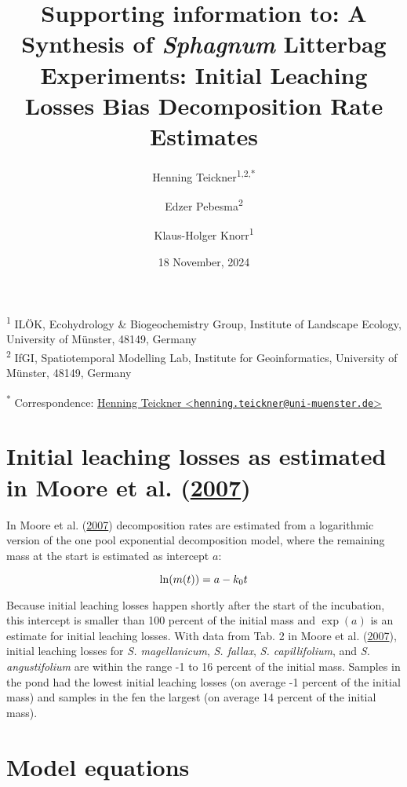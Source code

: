 \documentclass[
  12pt,
]{article}
\title{Supporting information to: A Synthesis of \emph{Sphagnum} Litterbag Experiments: Initial Leaching Losses Bias Decomposition Rate Estimates}
\author{Henning Teickner\textsuperscript{1,2,*} \and Edzer Pebesma\textsuperscript{2} \and Klaus-Holger Knorr\textsuperscript{1}}
\date{18 November, 2024}
\begin{document}
\maketitle

{
\setcounter{tocdepth}{2}
\tableofcontents
}
\textsuperscript{1} ILÖK, Ecohydrology \& Biogeochemistry Group, Institute of Landscape Ecology, University of Münster, 48149, Germany\\
\textsuperscript{2} IfGI, Spatiotemporal Modelling Lab, Institute for Geoinformatics, University of Münster, 48149, Germany

\textsuperscript{*} Correspondence: \href{mailto:henning.teickner@uni-muenster.de}{Henning Teickner \textless{}\href{mailto:henning.teickner@uni-muenster.de}{\nolinkurl{henning.teickner@uni-muenster.de}}\textgreater{}}

\renewcommand{\thefigure}{S\arabic{figure}} 
\renewcommand{\thetable}{S\arabic{table}}
\renewcommand{\thesection}{S\arabic{section}}
\renewcommand{\theequation}{S\arabic{equation}}

\hypertarget{sup-1}{%
\section{\texorpdfstring{Initial leaching losses as estimated in Moore et al. (\protect\hyperlink{ref-Moore.2007}{2007})}{Initial leaching losses as estimated in Moore et al. (2007)}}\label{sup-1}}

In Moore et al. (\protect\hyperlink{ref-Moore.2007}{2007}) decomposition rates are estimated from a logarithmic version of the one pool exponential decomposition model, where the remaining mass at the start is estimated as intercept \(a\):

\[
\ln(m(t)) = a - k_0t\\
\]

Because initial leaching losses happen shortly after the start of the incubation, this intercept is smaller than 100 percent of the initial mass and \(\exp(a)\) is an estimate for initial leaching losses. With data from Tab. 2 in Moore et al. (\protect\hyperlink{ref-Moore.2007}{2007}), initial leaching losses for \emph{S. magellanicum}, \emph{S. fallax}, \emph{S. capillifolium}, and \emph{S. angustifolium} are within the range -1 to 16 percent of the initial mass. Samples in the pond had the lowest initial leaching losses (on average -1 percent of the initial mass) and samples in the fen the largest (on average 14 percent of the initial mass).

\hypertarget{sup-13}{%
\section{Model equations}\label{sup-13}}
\end{document}
